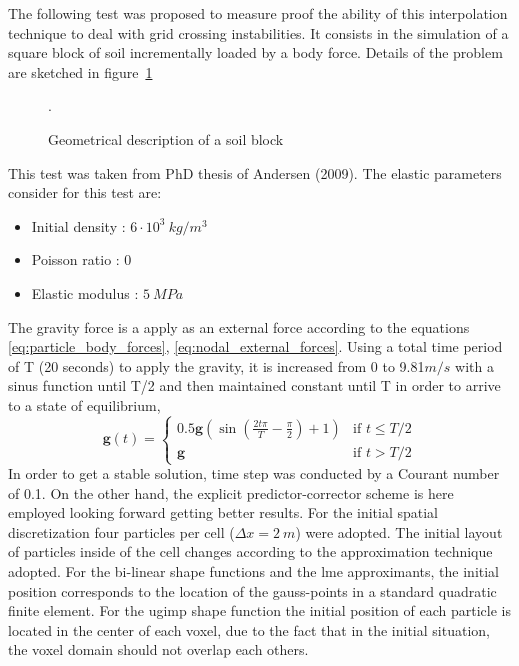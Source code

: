 \documentclass[preprint,12pt,a4paper]{elsarticle}
\begin{document}
The following test was proposed to measure proof the ability of this
interpolation technique to deal with grid crossing instabilities. It
consists in the simulation of a square block of soil incrementally
loaded by a body force. Details of the problem are sketched in figure~\ref{fig:block}
\begin{figure}\sidecaption
  \centering
  \resizebox{0.7\hsize}{!}{
    }
  \caption{Geometrical description of a soil block }.
  \label{fig:block}
\end{figure}
This test was taken from PhD thesis of Andersen (2009)\cite{thesis_Andersen_2009}. The
elastic parameters consider for this test are: 
\begin{itemize} 
\item  Initial density : $6\cdot 10^3\ kg/m^3$
\item  Poisson ratio : $0$
\item  Elastic modulus : $5\ MPa$
\end{itemize}
The gravity force is a apply as an external force according to the
equations \eqref{eq:particle_body_forces},
\eqref{eq:nodal_external_forces}. Using a total time period of T (20
seconds) to apply the gravity, it is increased from 0 to 9.81$m/s$
with a sinus function until T/2 and then maintained constant until T
in order to arrive to a state of equilibrium, 
\begin{equation}
  \label{eq:gravity-load-block}
 \mathbf{g}(t) = \left\{
    \begin{array}{ll}
      0.5 \mathbf{g} (\sin(\frac{2t \pi}{T} - \frac{\pi}{2})+1)  & \mbox{if } t \leq T/2 \\
      \mathbf{g} & \mbox{if } t > T/2
    \end{array}
  \right.
\end{equation}
In order to get a stable solution, time step was conducted by a
Courant number of 0.1. On the other hand, the explicit
predictor-corrector scheme is here employed looking forward getting better results. For the
initial spatial discretization four particles per cell
($\Delta x = 2\ m$) were adopted. The initial layout of particles inside of the
cell changes according to the approximation technique adopted. For the
bi-linear shape functions and the \acrshort{lme} approximants, the initial
position corresponds to the location of the gauss-points in a standard
quadratic finite element. For the \acrshort{ugimp} shape function the initial
position of each particle is located in the center of each voxel, due
to the fact that in the initial situation, the voxel domain should not
overlap each others.
\end{document}
